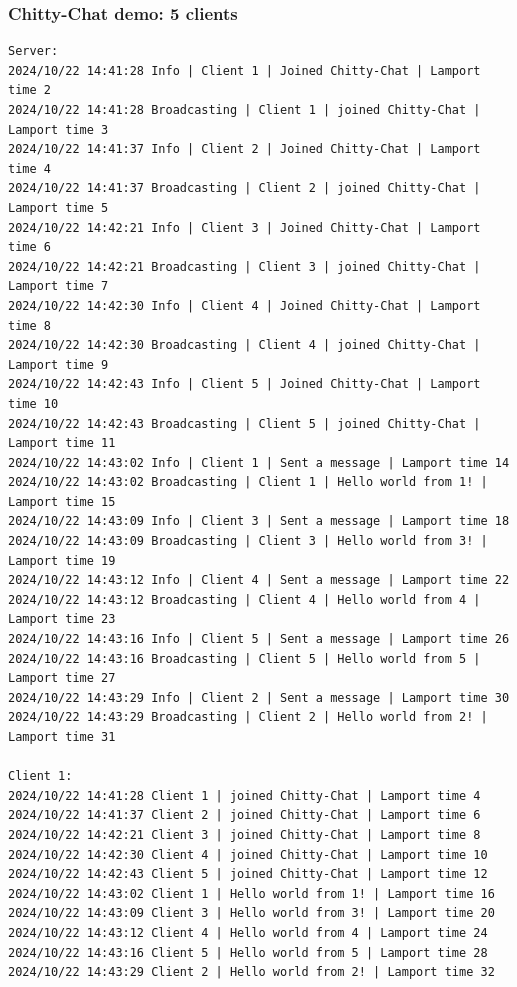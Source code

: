 \documentclass[a4paper,11pt]{article}
\begin{document}
\subsubsection*{Chitty-Chat demo: 5 clients}
\begin{lstlisting}[basicstyle=\ttfamily\footnotesize]
Server:
2024/10/22 14:41:28 Info | Client 1 | Joined Chitty-Chat | Lamport time 2
2024/10/22 14:41:28 Broadcasting | Client 1 | joined Chitty-Chat | Lamport time 3
2024/10/22 14:41:37 Info | Client 2 | Joined Chitty-Chat | Lamport time 4
2024/10/22 14:41:37 Broadcasting | Client 2 | joined Chitty-Chat | Lamport time 5
2024/10/22 14:42:21 Info | Client 3 | Joined Chitty-Chat | Lamport time 6
2024/10/22 14:42:21 Broadcasting | Client 3 | joined Chitty-Chat | Lamport time 7
2024/10/22 14:42:30 Info | Client 4 | Joined Chitty-Chat | Lamport time 8
2024/10/22 14:42:30 Broadcasting | Client 4 | joined Chitty-Chat | Lamport time 9
2024/10/22 14:42:43 Info | Client 5 | Joined Chitty-Chat | Lamport time 10
2024/10/22 14:42:43 Broadcasting | Client 5 | joined Chitty-Chat | Lamport time 11
2024/10/22 14:43:02 Info | Client 1 | Sent a message | Lamport time 14
2024/10/22 14:43:02 Broadcasting | Client 1 | Hello world from 1! | Lamport time 15
2024/10/22 14:43:09 Info | Client 3 | Sent a message | Lamport time 18
2024/10/22 14:43:09 Broadcasting | Client 3 | Hello world from 3! | Lamport time 19
2024/10/22 14:43:12 Info | Client 4 | Sent a message | Lamport time 22
2024/10/22 14:43:12 Broadcasting | Client 4 | Hello world from 4 | Lamport time 23
2024/10/22 14:43:16 Info | Client 5 | Sent a message | Lamport time 26
2024/10/22 14:43:16 Broadcasting | Client 5 | Hello world from 5 | Lamport time 27
2024/10/22 14:43:29 Info | Client 2 | Sent a message | Lamport time 30
2024/10/22 14:43:29 Broadcasting | Client 2 | Hello world from 2! | Lamport time 31

Client 1:
2024/10/22 14:41:28 Client 1 | joined Chitty-Chat | Lamport time 4
2024/10/22 14:41:37 Client 2 | joined Chitty-Chat | Lamport time 6
2024/10/22 14:42:21 Client 3 | joined Chitty-Chat | Lamport time 8
2024/10/22 14:42:30 Client 4 | joined Chitty-Chat | Lamport time 10
2024/10/22 14:42:43 Client 5 | joined Chitty-Chat | Lamport time 12
2024/10/22 14:43:02 Client 1 | Hello world from 1! | Lamport time 16
2024/10/22 14:43:09 Client 3 | Hello world from 3! | Lamport time 20
2024/10/22 14:43:12 Client 4 | Hello world from 4 | Lamport time 24
2024/10/22 14:43:16 Client 5 | Hello world from 5 | Lamport time 28
2024/10/22 14:43:29 Client 2 | Hello world from 2! | Lamport time 32


\end{lstlisting}
\end{document}
